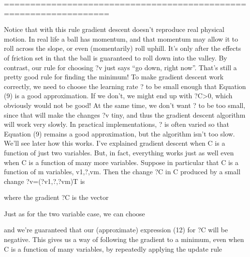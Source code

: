 ==================================================================


Notice that with this rule gradient descent doesn't reproduce real physical motion. In real life a ball has momentum, and that momentum may allow it to roll across the slope, or even (momentarily) roll uphill. It's only after the effects of friction set in that the ball is guaranteed to roll down into the valley. By contrast, our rule for choosing ?v just says ``go down, right now''. That's still a pretty good rule for finding the minimum!
To make gradient descent work correctly, we need to choose the learning rate ? to be small enough that Equation (9) is a good approximation. If we don't, we might end up with ?C>0, which obviously would not be good! At the same time, we don't want ? to be too small, since that will make the changes ?v tiny, and thus the gradient descent algorithm will work very slowly. In practical implementations, ? is often varied so that Equation (9) remains a good approximation, but the algorithm isn't too slow. We'll see later how this works. 
I've explained gradient descent when C is a function of just two variables. But, in fact, everything works just as well even when C is a function of many more variables. Suppose in particular that C is a function of m variables, v1,?,vm. Then the change ?C in C produced by a small change ?v=(?v1,?,?vm)T is 

where the gradient ?C is the vector 

Just as for the two variable case, we can choose 

and we're guaranteed that our (approximate) expression (12) for ?C will be negative. This gives us a way of following the gradient to a minimum, even when C is a function of many variables, by repeatedly applying the update rule 

